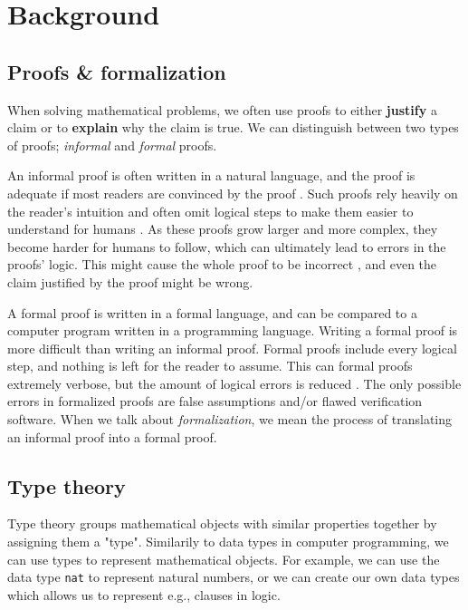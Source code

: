\chapter{Background}
\label{ch:background}

\section{Proofs \& formalization}
\label{sec:proofs_formalization}

When solving mathematical problems, we often use proofs
to either \textbf{justify} a claim or to \textbf{explain} why the claim is true.
We can distinguish between two types of proofs; \emph{informal} and \emph{formal} proofs.

An informal proof is often written in a natural language, and the proof is adequate if most
readers are convinced by the proof \cite{bpierce}. Such proofs rely heavily on the reader's intuition
and often omit logical steps to make them easier to understand for humans \cite{ams:formal-proof}.
As these proofs grow larger and more complex, they become harder for humans to follow,
which can ultimately lead to errors in the proofs' logic. This might cause the whole proof
to be incorrect \cite{rkhamsi}, and even the claim justified by the proof might be wrong.

A formal proof is written in a formal language, and can be compared to a computer program
written in a programming language. Writing a formal proof is more difficult than writing an informal proof.
Formal proofs include every logical step, and nothing is left for the reader to assume.
This can formal proofs extremely verbose, but the amount of logical errors is reduced \cite{ams:formal-proof}.
The only possible errors in formalized proofs are false assumptions and/or flawed verification software.
When we talk about \emph{formalization}, we mean the process of translating an informal proof into a formal proof.

\section{Type theory}
\label{sec:type_theory}

Type theory groups mathematical objects with similar properties together by assigning them a "type".
Similarily to data types in computer programming, we can use types to represent mathematical
objects. For example, we can use the data type \texttt{nat} to represent natural numbers, or we can create
our own data types which allows us to represent e.g., clauses in logic.

